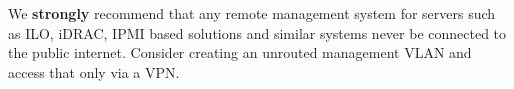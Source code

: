 

We \textbf{strongly} recommend that any remote management system for servers such as ILO, iDRAC, IPMI based solutions and similar systems never be connected to the public internet.
Consider creating an unrouted management VLAN and access that only via a VPN.